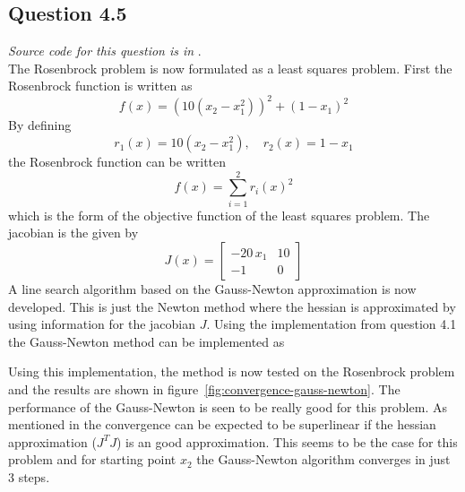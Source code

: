 \pagebreak

\subsection*{Question 4.5}
\textit{Source code for this question is in }. \\
The Rosenbrock problem is now formulated as a least squares problem. First the Rosenbrock function is written as
\begin{equation*}
    f(x) = (10(x_2 - x_1^2))^2 + (1 - x_1)^2
\end{equation*}
By defining
\begin{equation*}
    r_1(x) = 10(x_2 - x_1^2), \quad r_2(x) = 1 - x_1
\end{equation*}
the Rosenbrock function can be written
\begin{equation*}
    f(x) = \sum_{i=1}^2 r_i(x)^2
\end{equation*}
which is the form of the objective function of the least squares problem. The jacobian is the given by
\begin{equation*}
    J(x) = \begin{bmatrix}
        -20\,x_1 & 10 \\
        -1 & 0
    \end{bmatrix}
\end{equation*}
A line search algorithm based on the Gauss-Newton approximation is now developed. This is just the Newton method where the hessian is approximated by using information for the jacobian $J$. Using the  implementation from question 4.1 the Gauss-Newton method can be implemented as

Using this implementation, the method is now tested on the Rosenbrock problem and the results are shown in figure~\ref{fig:convergence-gauss-newton}. The performance of the Gauss-Newton is seen to be really good for this problem. As mentioned in \cite[page. 257]{nocedal06} the convergence can be expected to be superlinear if the hessian approximation ($J^TJ$) is an good approximation. This seems to be the case for this problem and for starting point $x_2$ the Gauss-Newton algorithm converges in just 3 steps.

